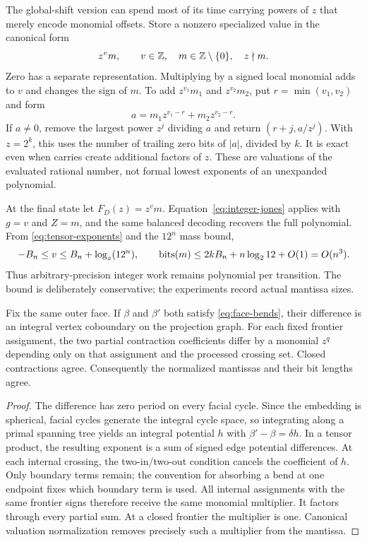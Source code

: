 The global-shift version can spend most of its time carrying powers of $z$
that merely encode monomial offsets. Store a nonzero specialized value in
the canonical form
\[
 z^v m,\qquad v\in\mathbb Z,\quad m\in\mathbb Z\setminus\{0\},\quad z\nmid m.
\]
Zero has a separate representation. Multiplying by a signed local monomial
adds to $v$ and changes the sign of $m$. To add $z^{v_1}m_1$ and
$z^{v_2}m_2$, put $r=\min(v_1,v_2)$ and form
\[
 a=m_1z^{v_1-r}+m_2z^{v_2-r}.
\]
If $a\ne0$, remove the largest power $z^j$ dividing $a$ and return
$(r+j,a/z^j)$. With $z=2^k$, this uses the number of trailing zero bits of
$|a|$, divided by $k$. It is exact even when carries create additional
factors of $z$. These are valuations of the evaluated rational number,
not formal lowest exponents of an unexpanded polynomial.

At the final state let $F_D(z)=z^v m$. Equation~\eqref{eq:integer-jones}
applies with $g=v$ and $Z=m$, and the same balanced decoding recovers the
full polynomial. From \eqref{eq:tensor-exponents} and the $12^n$ mass bound,
\[
 -B_n\leq v\leq B_n+\log_z(12^n),\qquad
 \operatorname{bits}(m)\leq2kB_n+n\log_2 12+O(1)=O(n^3).
\]
Thus arbitrary-precision integer work remains polynomial per transition.
The bound is deliberately conservative; the experiments record actual
mantissa sizes.

\begin{proposition}
Fix the same outer face. If $\beta$ and $\beta'$ both satisfy
\eqref{eq:face-bends}, their difference is an integral vertex coboundary
on the projection graph. For each fixed frontier assignment, the two partial
contraction coefficients differ by a monomial $z^q$ depending only on that
assignment and the processed crossing set. Closed contractions agree.
Consequently the normalized mantissas and their bit lengths agree.
\label{prop:gauge}
\end{proposition}
\begin{proof}
The difference has zero period on every facial cycle. Since the embedding
is spherical, facial cycles generate the integral cycle space, so integrating
along a primal spanning tree yields an integral potential $h$ with
$\beta'-\beta=\delta h$. In a tensor product, the resulting exponent is a
sum of signed edge potential differences. At each internal crossing, the
two-in/two-out condition cancels the coefficient of $h$. Only boundary
terms remain; the convention for absorbing a bend at one endpoint fixes
which boundary term is used. All internal assignments with the same
frontier signs therefore receive the same monomial multiplier. It factors
through every partial sum. At a closed frontier the multiplier is one.
Canonical valuation normalization removes precisely such a multiplier
from the mantissa.
\end{proof}


